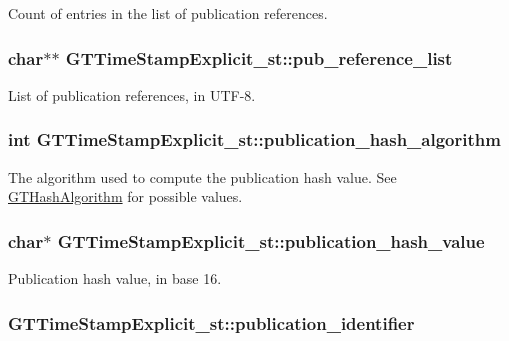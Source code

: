 \label{struct_g_t_time_stamp_explicit__st_a3906ff3ffd36ebce3243b55c3fe46083}
Count of entries in the list of publication references. \hypertarget{struct_g_t_time_stamp_explicit__st_a0fadfc61f93275238ab793485e4278be}{
\subsubsection[{pub\_\-reference\_\-list}]{\setlength{\rightskip}{0pt plus 5cm}char$\ast$$\ast$ {\bf GTTimeStampExplicit\_\-st::pub\_\-reference\_\-list}}}
\label{struct_g_t_time_stamp_explicit__st_a0fadfc61f93275238ab793485e4278be}
List of publication references, in UTF-\/8. \hypertarget{struct_g_t_time_stamp_explicit__st_a78953758fec49c15de4271239daf6c69}{
\subsubsection[{publication\_\-hash\_\-algorithm}]{\setlength{\rightskip}{0pt plus 5cm}int {\bf GTTimeStampExplicit\_\-st::publication\_\-hash\_\-algorithm}}}
\label{struct_g_t_time_stamp_explicit__st_a78953758fec49c15de4271239daf6c69}
The algorithm used to compute the publication hash value. See \hyperlink{group__common_ga5110e02245c37b4ff48ea4c4efb2924a}{GTHashAlgorithm} for possible values. \hypertarget{struct_g_t_time_stamp_explicit__st_a9a6d8447d20ec6f54760d3e9f5653f5a}{
\subsubsection[{publication\_\-hash\_\-value}]{\setlength{\rightskip}{0pt plus 5cm}char$\ast$ {\bf GTTimeStampExplicit\_\-st::publication\_\-hash\_\-value}}}
\label{struct_g_t_time_stamp_explicit__st_a9a6d8447d20ec6f54760d3e9f5653f5a}
Publication hash value, in base 16. \hypertarget{struct_g_t_time_stamp_explicit__st_a99428914cd47f90062a204f6578abcd5}{
\subsubsection[{publication\_\-identifier}]{ {\bf GTTimeStampExplicit\_\-st::publication\_\-identifier}}}

